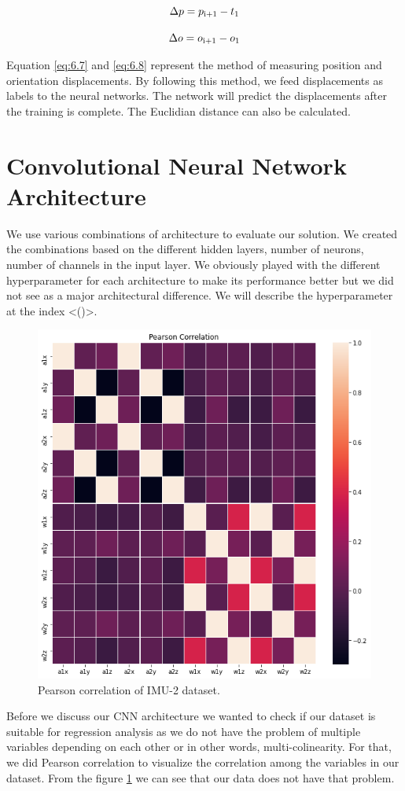\begin{equation}
  \Delta p= p\textsubscript{i+1} - t\textsubscript{1}  \label{eq:6.7}
\end{equation}

\begin{equation}
  \Delta o= o\textsubscript{i+1} - o\textsubscript{1}  \label{eq:6.8}
\end{equation}

Equation \ref{eq:6.7} and  \ref{eq:6.8} represent the method of measuring position and orientation displacements. By following this method, we feed displacements as labels to the neural networks. The network will predict the displacements after the training is complete. The Euclidian distance can also be calculated.


\section{Convolutional Neural Network Architecture}


We use various combinations of architecture to evaluate our solution. We created the combinations based on the different hidden layers, number of neurons, number of channels in the input layer. We obviously played with the different hyperparameter for each architecture to make its performance better but we did not see as a major architectural difference. We will describe the hyperparameter at the index <()>.

\begin{figure}[h]
  \centering
    \includegraphics[width=0.5\linewidth]{figures/dataCorelation.png}
    \caption{Pearson correlation of IMU-2 dataset.}
\label{fig:dataCorelation}
\end{figure}

Before we discuss our CNN architecture we wanted to check if our dataset is suitable for regression analysis as we do not have the problem of multiple variables depending on each other or in other words, multi-colinearity.  For that, we did Pearson correlation to visualize the correlation among the variables in our dataset. From the figure \ref{fig:dataCorelation} we can see that our data does not have that problem.

